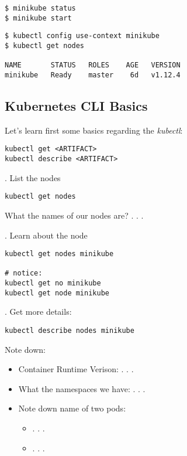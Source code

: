 \documentclass[12pt, letterpaper]{article}
\begin{document}
\begin{verbatim}
$ minikube status
$ minikube start
\end{verbatim}

\begin{verbatim}
$ kubectl config use-context minikube
$ kubectl get nodes

NAME       STATUS   ROLES    AGE   VERSION
minikube   Ready    master    6d   v1.12.4
\end{verbatim}


\subsection{Kubernetes CLI Basics}

Let's learn first some basics regarding the \textit{kubectl}:

\begin{verbatim}
kubectl get <ARTIFACT>
kubectl describe <ARTIFACT>
\end{verbatim}

. List the nodes

\begin{verbatim}
kubectl get nodes
\end{verbatim}

What the names of our nodes are? . . .

. Learn about the node

\begin{verbatim}
kubectl get nodes minikube

# notice:
kubectl get no minikube
kubectl get node minikube
\end{verbatim}

. Get more details: 

\begin{lstlisting}
kubectl describe nodes minikube
\end{lstlisting}

Note down:
\begin{itemize}
    \item Container Runtime Verison: . . .
    \item  What the namespaces we have: . . .
    \item  Note down name of two pods:\begin{itemize}
        \item . . .
        \item . . .
     \end{itemize}
\end{itemize}
\end{document}
